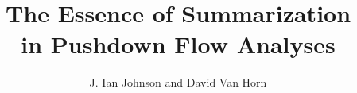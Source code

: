 \documentclass[article]{llncs}
\begin{document}
\title{The Essence of Summarization\\ in Pushdown Flow Analyses}
\author{J. Ian Johnson and David Van Horn}


\maketitle

\begin{abstract}

\end{abstract}







\iftr{\appendix{}}
\end{document}
